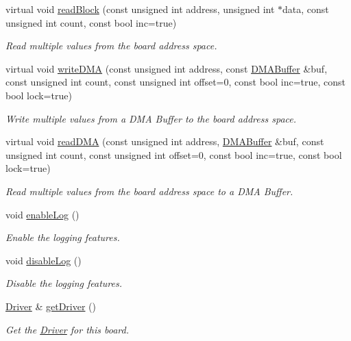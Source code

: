 \begin{CompactItemize}
virtual void \hyperlink{classmprace_1_1Board_a6}{read\-Block} (const unsigned int address, unsigned int $\ast$data, const unsigned int count, const bool inc=true)
\begin{CompactList}\small\item\em Read multiple values from the board address space. \item\end{CompactList}\item 
virtual void \hyperlink{classmprace_1_1Board_a7}{write\-DMA} (const unsigned int address, const \hyperlink{classmprace_1_1DMABuffer}{DMABuffer} \&buf, const unsigned int count, const unsigned int offset=0, const bool inc=true, const bool lock=true)
\begin{CompactList}\small\item\em Write multiple values from a DMA Buffer to the board address space. \item\end{CompactList}\item 
virtual void \hyperlink{classmprace_1_1Board_a8}{read\-DMA} (const unsigned int address, \hyperlink{classmprace_1_1DMABuffer}{DMABuffer} \&buf, const unsigned int count, const unsigned int offset=0, const bool inc=true, const bool lock=true)
\begin{CompactList}\small\item\em Read multiple values from the board address space to a DMA Buffer. \item\end{CompactList}\item 
void \hyperlink{classmprace_1_1Board_a9}{enable\-Log} ()
\begin{CompactList}\small\item\em Enable the logging features. \item\end{CompactList}\item 
void \hyperlink{classmprace_1_1Board_a10}{disable\-Log} ()
\begin{CompactList}\small\item\em Disable the logging features. \item\end{CompactList}\item 
\hyperlink{classmprace_1_1Driver}{Driver} \& \hyperlink{classmprace_1_1Board_a11}{get\-Driver} ()
\begin{CompactList}\small\item\em Get the \hyperlink{classmprace_1_1Driver}{Driver} for this board. \item\end{CompactList}\item 

\end{CompactItemize}
